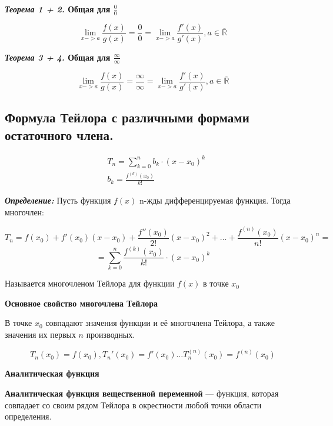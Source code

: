 \documentclass[a4paper,12pt]{article}
\theoremstyle{plain} %
\theoremstyle{definition} %
\theoremstyle{remark} %
\begin{document}
\textbf{\textit{Теорема 1 + 2.} Общая для $\frac{0}{0}$}

\[
	\lim_{x -> a} \frac{f(x)}{g(x)} = \frac{0}{0} = \lim_{x->a} \frac{f'(x)}{g'(x)}, a \in \overline{ \mathbb{R}}
\]



\textbf{\textit{Теорема 3 + 4.} Общая для $\frac{\infty}{\infty}$}

\[
	\lim_{x -> a} \frac{f(x)}{g(x)} = \frac{\infty}{\infty} = \lim_{x->a} \frac{f'(x)}{g'(x)}, a \in \overline{ \mathbb{R}}
\]



\newpage

\subsection*{Формула Тейлора с различными формами остаточного члена.                                   }

\begin{equation*}
	\begin{aligned}
		 & T_n = \sum_{k=0}^n b_k \cdot (x - x_0)^k \\
		 & b_k = \frac{f^{(k)}(x_0)}{k!}
	\end{aligned}
\end{equation*}

\textbf{\textit{Определение:}}
Пусть функция $f(x)$ n-жды дифференцируемая функция.
Тогда многочлен:

\[
	T_n = f(x_0) + f'(x_0)(x-x_0) + \frac{f''(x_0)}{2!}(x-x_0)^2 + \dots + \frac{f^{(n)}(x_0)}{n!}(x-x_0)^n = \] \[ = \sum_{k=0}^n \frac{f^{(k)}(x_0)}{k!} \cdot (x - x_0)^k
\]

Называется многочленом Тейлора для функции $f(x)$ в точке $x_0$


\begin{center}
	\textbf{Основное свойство многочлена Тейлора}
\end{center}

В точке $x_0$ совпадают значения функции и её многочлена Тейлора, а также значения их первых $n$ производных.

\[
	T_n(x_0) = f(x_0), T_n'(x_0) = f'(x_0) \dots T_n^{(n)}(x_0) = f^{(n)}(x_0)
\]

\begin{center}
	\textbf{Аналитическая функция}
\end{center}

\textbf{Аналитическая функция вещественной переменной} — функция, которая совпадает со своим рядом Тейлора в окрестности любой точки области определения.
\end{document}
